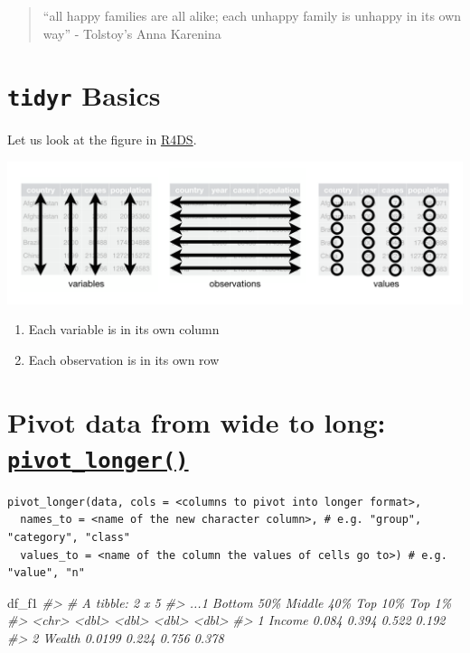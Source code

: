 \documentclass[
  xelatex, ja=standard]{bxjsbook}
\newenvironment{Shaded}{\begin{snugshade}}{\end{snugshade}}
\newcommand{\CommentTok}[1]{\textcolor[rgb]{0.56,0.35,0.01}{\textit{#1}}}
\newcommand{\NormalTok}[1]{#1}
\providecommand{\tightlist}{%
  \setlength{\itemsep}{0pt}\setlength{\parskip}{0pt}}
\theoremstyle{definition}
\theoremstyle{definition}
\theoremstyle{definition}
\theoremstyle{definition}
\theoremstyle{remark}
\begin{document}
\begin{quote}
``all happy families are all alike; each unhappy family is unhappy in its own way'' - Tolstoy's Anna Karenina
\end{quote}

\hypertarget{tidyr-basics}{%
\section{\texorpdfstring{\texttt{tidyr} Basics}{tidyr Basics}}\label{tidyr-basics}}

Let us look at the figure in \href{https://r4ds.hadley.nz/images/tidy-1.png}{R4DS}.

\includegraphics[width=1\linewidth]{./data/tidy-1}

\begin{enumerate}
\def\labelenumi{\arabic{enumi}.}
\tightlist
\item
  Each variable is in its own column
\item
  Each observation is in its own row
\end{enumerate}

\hypertarget{pivot-data-from-wide-to-long-pivot_longer}{%
\section{\texorpdfstring{Pivot data from wide to long: \href{https://tidyr.tidyverse.org/reference/pivot_longer.html}{\texttt{pivot\_longer()}}}{Pivot data from wide to long: pivot\_longer()}}\label{pivot-data-from-wide-to-long-pivot_longer}}

\begin{verbatim}
pivot_longer(data, cols = <columns to pivot into longer format>,
  names_to = <name of the new character column>, # e.g. "group", "category", "class"
  values_to = <name of the column the values of cells go to>) # e.g. "value", "n"
\end{verbatim}

\begin{Shaded}
\begin{Highlighting}[]
\NormalTok{df\_f1}
\CommentTok{\#\textgreater{} \# A tibble: 2 x 5}
\CommentTok{\#\textgreater{}   ...1   \textasciigrave{}Bottom 50\%\textasciigrave{} \textasciigrave{}Middle 40\%\textasciigrave{} \textasciigrave{}Top 10\%\textasciigrave{} \textasciigrave{}Top 1\%\textasciigrave{}}
\CommentTok{\#\textgreater{}   \textless{}chr\textgreater{}         \textless{}dbl\textgreater{}        \textless{}dbl\textgreater{}     \textless{}dbl\textgreater{}    \textless{}dbl\textgreater{}}
\CommentTok{\#\textgreater{} 1 Income       0.084         0.394     0.522    0.192}
\CommentTok{\#\textgreater{} 2 Wealth       0.0199        0.224     0.756    0.378}
\end{Highlighting}
\end{Shaded}
\end{document}
